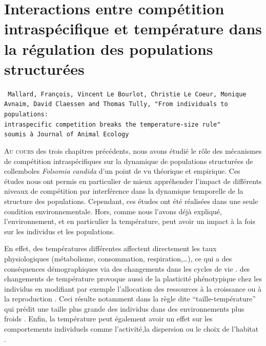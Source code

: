 \chapter{Interactions entre compétition intraspécifique et température dans la
régulation des populations structurées}
\label{chap:fip}

\vspace{2cm}
\begin{Spacing}{1}
\texttt{
Mallard, François, Vincent Le Bourlot, Christie Le Coeur, Monique Avnaim, David
Claessen and Thomas Tully, "From individuals to populations: \\intraspecific
competition breaks the temperature-size rule"\\
soumis à Journal of Animal Ecology}
\end{Spacing}
\vspace{2cm}


\lettrine[lines=3]{A}{u cours} des trois chapitres précédents, nous avons étudié
le rôle des mécanismes de compétition intraspécifiques sur la dynamique de
populations structurées de collemboles \textit{Folsomia candida} d'un point de vu théorique
et empirique. Ces études nous ont permis en particulier de mieux appréhender
l'impact de différents niveaux de compétition par interférence dans la
dynamique temporelle de la structure des populations. Cependant, ces études ont
été réalisées dans une seule condition environnementale. Hors, comme nous
l'avons déjà expliqué, l'environnement, et en particulier la température, peut
avoir un impact à la fois sur les individus et les populations. 

En effet, des températures différentes affectent directement les taux
physiologiques (métabolisme, consommation, respiration,\ldots), ce qui a des
conséquences démographiques via des changements dans les cycles de vie
\autocites{gillooly2002a,le-galliard2012a}. des changements de température
provoque aussi de la plasticité phénotypique chez les individus en modifiant par
exemple l'allocation des ressources à la croissance ou à la reproduction
\autocites{liefting2010temperature,gutteling2007mapping}. Ceci résulte notamment
dans la règle dite ``taille-température'' qui prédit une taille plus grande des
individus dans des environnements plus froids
\autocites{atkinson1994a,atkinson1996a,angilletta2009a}. Enfin, la température
peut également avoir un effet sur les comportements individuels comme
l'activité,la dispersion ou le choix de l'habitat
\autocites{atacho2013a,bonte2008thermal,vanbeest2012temperature}.

